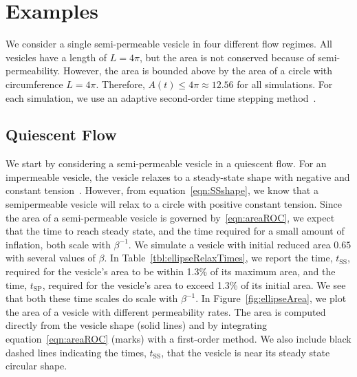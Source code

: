 \documentclass[aps,prl,showpacs]{revtex4}
\begin{document}


\section{Examples}
We consider a single semi-permeable vesicle in four different flow
regimes. All vesicles have a length of $L=4\pi$, but the area is not
conserved because of semi-permeability. However, the area is bounded
above by the area of a circle with circumference $L=4\pi$. Therefore,
$A(t) \leq 4\pi \approx 12.56$ for all simulations. For each simulation,
we use an adaptive second-order time stepping method~\cite{qua-bir2016}. 



\subsection{Quiescent Flow} 
We start by considering a semi-permeable vesicle in a quiescent flow.
For an impermeable vesicle, the vesicle relaxes to a steady-state shape
with negative and constant tension~\cite{kra-win-sei-lip1996}. However,
from equation~\eqref{eqn:SSshape}, we know that a semipermeable vesicle
will relax to a circle with positive constant tension. Since the area of
a semi-permeable vesicle is governed by~\eqref{eqn:areaROC}, we expect
that the time to reach steady state, and the time required for a small
amount of inflation, both scale with $\beta^{-1}$. We simulate a vesicle
with initial reduced area $0.65$ with several values of $\beta$.  In
Table~\ref{tbl:ellipseRelaxTimes}, we report the time, $t_\mathrm{SS}$,
required for the vesicle's area to be within 1.3\% of its maximum area,
and the time, $t_\mathrm{SP}$, required for the vesicle's area to exceed
1.3\% of its initial area. We see that both these time scales do scale
with $\beta^{-1}$. In Figure~\ref{fig:ellipseArea}, we plot the area of
a vesicle with different permeability rates. The area is computed
directly from the vesicle shape (solid lines) and by integrating
equation~\eqref{eqn:areaROC} (marks) with a first-order method. We also
include black dashed lines indicating the times, $t_{\mathrm{SS}}$, that
the vesicle is near its steady state circular shape.
\end{document}
